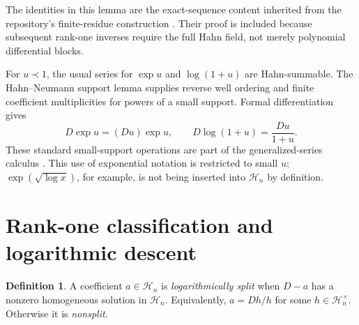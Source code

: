 \documentclass[11pt,a4paper]{article}
\numberwithin{equation}{section}
\theoremstyle{definition}
\newtheorem{definition}[theorem]{Definition}
\theoremstyle{remark}\newtheorem{remark}[theorem]{Remark}
\newcommand{\Hh}{\mathcal H}\newcommand{\Ll}{\mathcal L}
\begin{document}
The identities in this lemma are the exact-sequence content inherited from the repository's finite-residue construction \cite{repo-residue,repo-smith}. Their proof is included because subsequent rank-one inverses require the full Hahn field, not merely polynomial differential blocks.

For $u\prec1$, the usual series for $\exp u$ and $\log(1+u)$ are Hahn-summable. The Hahn--Neumann support lemma supplies reverse well ordering and finite coefficient multiplicities for powers of a small support. Formal differentiation gives
\begin{equation}
 D\exp u=(Du)\exp u,\qquad
 D\log(1+u)=\frac{Du}{1+u}.
 \label{eq:explog}
\end{equation}
These standard small-support operations are part of the generalized-series calculus \cite{km,adh}. This use of exponential notation is restricted to small $u$; $\exp(\sqrt{\log x})$, for example, is not being inserted into $\Hh_n$ by definition.

\section{Rank-one classification and logarithmic descent}
\label{sec:rankone}
\begin{definition}
A coefficient $a\in\Hh_n$ is \emph{logarithmically split} when $D-a$ has a nonzero homogeneous solution in $\Hh_n$. Equivalently, $a=Dh/h$ for some $h\in\Hh_n^\times$. Otherwise it is \emph{nonsplit}.
\end{definition}
\end{document}
